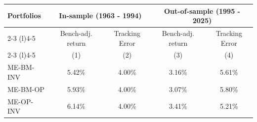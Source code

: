 \begin{tabular}{lcccc}
  \toprule \multirow{2}{*}{Portfolios} & \multicolumn{2}{c}{In-sample (1963 - 1994)} & \multicolumn{2}{c}{Out-of-sample (1995 - 2025)} \\
 \cmidrule(l){2-3} \cmidrule(l){4-5} & Bench-adj. return & Tracking Error & Bench-adj. return & Tracking Error  \\
 \cmidrule(l){2-3} \cmidrule(l){4-5}  \vspace{5pt}  & (1) & (2) & (3) & (4) \\ 
  ME-BM-INV & 5.42\% & 4.00\% & 3.16\% & 5.61\% \\ 
  ME-BM-OP & 5.93\% & 4.00\% & 3.07\% & 5.80\% \\ 
  ME-OP-INV & 6.14\% & 4.00\% & 3.41\% & 5.21\% \\ 
   \bottomrule 
\end{tabular}

